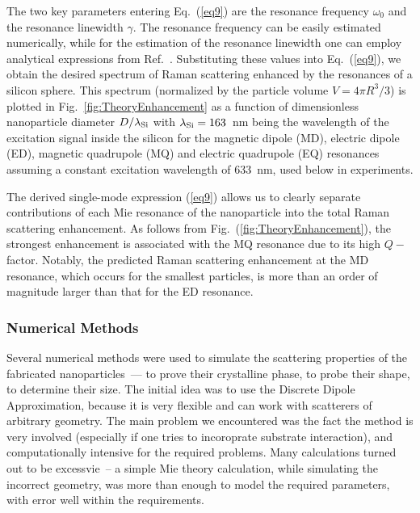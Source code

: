         The two key parameters entering Eq.~(\ref{eq9}) are the resonance frequency $\omega_0$ and the resonance linewidth $\gamma$.
        The resonance frequency can be easily estimated numerically, while for the estimation of the resonance linewidth one can
        employ analytical expressions from Ref.~\cite{lai1991effect}. Substituting these values into Eq.~(\ref{eq9}), we obtain the desired
        spectrum of Raman scattering enhanced by the resonances of a silicon sphere. This spectrum (normalized by the particle
        volume $V=4\pi R^3/3$) is plotted in Fig.~\ref{fig:TheoryEnhancement} as a  function of dimensionless nanoparticle diameter $D/\lambda_{\rm Si}$
        with $\lambda_{\rm Si}=163$~nm being the wavelength of the excitation signal inside the silicon for the magnetic dipole (MD), electric dipole (ED),
        magnetic quadrupole (MQ) and electric quadrupole (EQ) resonances assuming a constant excitation wavelength of 633~nm,
        used below in experiments.

        The derived single-mode expression (\ref{eq9}) allows us to clearly separate contributions of each Mie resonance of the
        nanoparticle into the total Raman scattering enhancement. As follows from Fig.~(\ref{fig:TheoryEnhancement}), the strongest enhancement
        is associated with the MQ resonance due to its high $Q-$factor. Notably, the predicted Raman scattering enhancement
        at the MD resonance, which occurs for the smallest particles, is more than an order of magnitude larger than that for
        the ED resonance.


    \subsubsection{Numerical Methods}
    \label{sec:Numeric}
        Several numerical methods were used to simulate the scattering properties of the fabricated nanoparticles~--- to prove their
        crystalline phase, to probe their shape, to determine their size. The initial idea was to use the Discrete Dipole Approximation,
        because it is very flexible and can work with scatterers of arbitrary geometry. The main problem we encountered was the fact
        the method is very involved (especially if one tries to incoroprate substrate interaction), and computationally intensive for
        the required problems. Many calculations turned out to be excessvie~-- a simple Mie theory calculation,
        while simulating the incorrect geometry, was more than enough to model the required parameters, with error well within the
        requirements.

